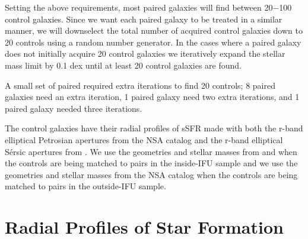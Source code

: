 \documentclass[iop,revtex4,twocolumn,apj,numberedappendix,appendixfloats]{emulateapj}
\begin{document}
Setting the above requirements, most paired galaxies will find between 20$-$100 control galaxies. Since we want each paired galaxy to be treated in a similar manner, we will downselect the total number of acquired control galaxies down to 20 controls using a random number generator. In the cases where a paired galaxy does not initially acquire 20 control galaxies we iteratively expand the stellar mass limit by 0.1 dex until at least 20 control galaxies are found. 

A small set of paired required extra iterations to find 20 controls; 8 paired galaxies need an extra iteration, 1 paired galaxy need two extra iterations, and 1 paired galaxy needed three iterations.

The control galaxies have their radial profiles of sSFR made with both the r-band elliptical Petrosian apertures from the NSA catalog and the r-band elliptical S\'ersic apertures from \citet{Simard:2011}. We use the geometries and stellar masses from \citet{Simard:2011} and \citet{Mendel:2014} when the controls are being matched to pairs in the inside-IFU sample and we use the geometries and stellar masses from the NSA catalog when the controls are being matched to pairs in the outside-IFU sample. 

\section{Radial Profiles of Star Formation}\label{sec:analysis}
\end{document}
